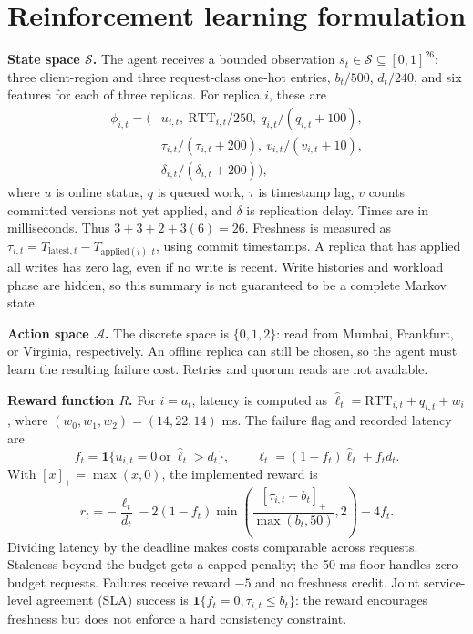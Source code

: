 \documentclass[10pt,a4paper,twocolumn]{article}
\newcommand{\ind}{\mathbf{1}}
\begin{document}
\section{Reinforcement learning formulation}
\textbf{State space $\mathcal{S}$.}
The agent receives a bounded observation
$s_t\in\mathcal{S}\subseteq[0,1]^{26}$:
three client-region and three request-class one-hot entries,
$b_t/500$, $d_t/240$, and six features for each of three replicas. For replica
$i$, these are
\[
\begin{aligned}
 \phi_{i,t}=\bigl(&u_{i,t},\ \mathrm{RTT}_{i,t}/250,
          \ q_{i,t}/(q_{i,t}+100),\\
       &\tau_{i,t}/(\tau_{i,t}+200),\ v_{i,t}/(v_{i,t}+10),\\
       &\delta_{i,t}/(\delta_{i,t}+200)\bigr),
\end{aligned}
\]
where $u$ is online status, $q$ is queued work, $\tau$ is timestamp lag,
$v$ counts committed versions not yet applied, and $\delta$ is replication
delay. Times are in milliseconds. Thus $3+3+2+3(6)=26$.
Freshness is measured as
$\tau_{i,t}=T_{\mathrm{latest},t}-T_{\mathrm{applied}(i),t}$,
using commit timestamps. A replica that has applied all writes has zero lag,
even if no write is recent. Write histories and workload phase are hidden, so
this summary is not guaranteed to be a complete Markov state.

\textbf{Action space $\mathcal{A}$.}
The discrete space is $\{0,1,2\}$: read from Mumbai, Frankfurt, or Virginia,
respectively. An offline replica can still be chosen, so the agent must learn
the resulting failure cost. Retries and quorum reads are not available.

\newpage %

\textbf{Reward function $R$.}
For $i=a_t$, latency is computed as
$\widehat{\ell}_t=\mathrm{RTT}_{i,t}+q_{i,t}+w_i$, where
$(w_0,w_1,w_2)=(14,22,14)$ ms. The failure flag and recorded latency are
\[
 f_t=\ind\{u_{i,t}=0\ \text{or}\ \widehat{\ell}_t>d_t\},\qquad
 \ell_t=(1-f_t)\widehat{\ell}_t+f_t d_t.
\]
With $[x]_+=\max(x,0)$, the implemented reward is
\[
\boxed{\displaystyle
 r_t=-\frac{\ell_t}{d_t}
 -2(1-f_t)\min\!\left(\frac{[\tau_{i,t}-b_t]_+}{\max(b_t,50)},2\right)
 -4f_t.}
\]
Dividing latency by the deadline makes costs comparable across requests.
Staleness beyond the budget gets a capped penalty; the 50 ms floor handles
zero-budget requests. Failures receive reward $-5$ and no freshness credit.
Joint service-level agreement (SLA) success is
$\ind\{f_t=0,\tau_{i,t}\leq b_t\}$: the reward encourages freshness but does
not enforce a hard consistency constraint.
\end{document}
